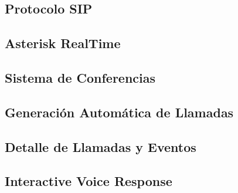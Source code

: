 

\subsection*{Protocolo SIP}



\subsection*{Asterisk RealTime}









\subsection*{Sistema de Conferencias}



\subsection*{Generación Automática de Llamadas}





\subsection*{Detalle de Llamadas y Eventos}



\subsection*{Interactive Voice Response}








